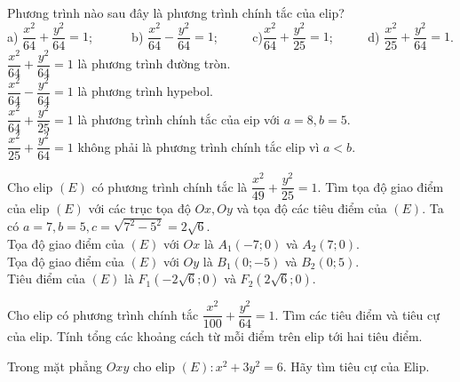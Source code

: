 \begin{bt}%
	Phương trình nào sau đây là phương trình chính tắc của elip?\\
	a) $\dfrac{x^2}{64}+\dfrac{y^2}{64}=1$; ~~~~~
	b) $\dfrac{x^2}{64}-\dfrac{y^2}{64}=1$;~~~~~
	c)$\dfrac{x^2}{64}+\dfrac{y^2}{25}=1$;~~~~~
	d) $\dfrac{x^2}{25}+\dfrac{y^2}{64}=1$.
	\loigiai 
	{	$\dfrac{x^2}{64}+\dfrac{y^2}{64}=1$ là phương trình đường tròn.\\
		$\dfrac{x^2}{64}-\dfrac{y^2}{64}=1$ là phương trình hypebol.\\
		$\dfrac{x^2}{64}+\dfrac{y^2}{25}=1$ là phương trình chính tắc của eip với $a=8, b=5$.\\
		$\dfrac{x^2}{25}+\dfrac{y^2}{64}=1$ không phải là phương trình chính tắc elip vì $a<b$.
	}
\end{bt}

\begin{bt}%
	Cho elip $(E)$ có phương trình chính tắc là $\dfrac{x^2}{49}+\dfrac{y^2}{25}=1$. Tìm tọa độ giao điểm của elip $(E)$ với các trục tọa độ $Ox, Oy$ và tọa độ các tiêu điểm của $(E)$.
	\loigiai 
	{
		Ta có $a=7, b=5, c=\sqrt{7^2-5^2}=2\sqrt{6}$.\\
		Tọa độ giao điểm của $(E)$ với $Ox$ là $A_1(-7;0)$ và $A_2(7;0)$.\\
		Tọa độ giao điểm của $(E)$ với $Oy$ là $B_1(0;-5)$ và $B_2(0;5)$.\\
		Tiêu điểm của $(E)$ là $F_1(-2\sqrt{6};0)$ và $F_2(2\sqrt{6};0)$.
	}
\end{bt}

\begin{bt}%
	Cho elip có phương trình chính tắc $\dfrac{x^{2}}{100}+\dfrac{y^{2}}{64}=1$. Tìm các tiêu điểm và tiêu cự của elip. Tính tổng các khoảng cách từ mỗi điểm trên elip tới hai tiêu điểm.
\end{bt}

\begin{bt}%
	Trong mặt phẳng $Oxy$ cho elip $\left(E\right):{x^2}+3y^2=6$. Hãy tìm tiêu cự của Elip.
\end{bt}

